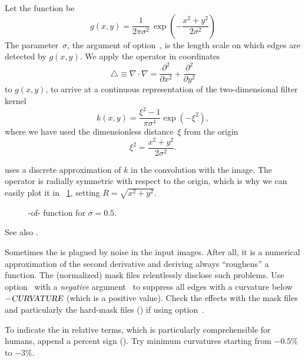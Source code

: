 Let the  function be
\[
    g(x, y) =
    \frac{1}{2 \pi \sigma^2} \,
    {\exp\left(-\frac{x^2 + y^2}{2 \sigma^2}\right)}
\]
\noindent The parameter~$\sigma$, the argument of option~, is the
length scale on which edges are detected by $g(x, y)$.  We apply the 
operator in  coordinates
\[
    \bigtriangleup \equiv \nabla \cdot \nabla =
    \frac{\partial^2}{\partial x^2} + \frac{\partial^2}{\partial y^2}
\]
\noindent to $g(x, y)$, to arrive at a continuous representation of the two-dimensional filter
kernel
\[
    k(x, y) = \frac{\xi^2 - 1}{\pi \sigma^4} \exp(-\xi^2),
\]
\noindent where we have used the dimensionless distance~$\xi$ from the origin
\[
    \xi^2 = \frac{x^2 + y^2}{2 \sigma^2}.
\]

\App{} uses a discrete approximation of $k$ in the convolution with the image.  The operator is
radially symmetric with respect to the origin, which is why we can easily plot it in
\figureName~\ref{fig:laplacian-of-gaussian}, setting $R = \sqrt{x^2 + y^2}$.


\begin{figure}[htbp]
  \ifreferencemanual\begin{maxipage}\fi
  \centering
  \ifreferencemanual\end{maxipage}\fi

  \caption[-of-]{\label{fig:laplacian-of-gaussian}%
    -of- function for $\sigma = 0.5$.}
\end{figure}


\noindent See also .

Sometimes the  is plagued by noise in the input images.  After all, it is a
numerical approximation of the second derivative and deriving always ``roughens'' a function.
The (normalized) mask files relentlessly disclose such problems.  Use
option~ with a \emph{negative} argument~ to
suppress all edges with a curvature below $-\textsl{CURVATURE}$ (which is a positive value).
Check the effects with the mask files and particularly the hard-mask files
() if using option~.

To indicate the  in relative terms, which is particularly comprehensible for
humans, append a percent sign (\sample{\%}).  Try minimum curvatures starting from $-0.5\%$ to
$-3\%$.

